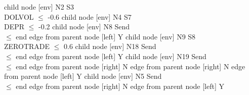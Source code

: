 
      child { node [env] {N2  S3 \\ DOLVOL $\leq$ -0.6} 
            child { node [env] {N4  S7 \\ DEPR $\leq$ -0.2} 
                  child { node [env] {N8  Send \\  $\leq$ end} 
                        edge from parent node [left] {Y} 
                  }
                  child { node [env] {N9  S8 \\ ZEROTRADE $\leq$ 0.6} 
                        child { node [env] {N18  Send \\  $\leq$ end} 
                              edge from parent node [left] {Y} 
                        }
                        child { node [env] {N19  Send \\  $\leq$ end} 
                              edge from parent node [right] {N} 
                        }
                        edge from parent node [right] {N} 
                  }
                  edge from parent node [left] {Y} 
            }
            child { node [env] {N5  Send \\  $\leq$ end} 
                  edge from parent node [right] {N} 
            }
            edge from parent node [left] {Y} 
      }
